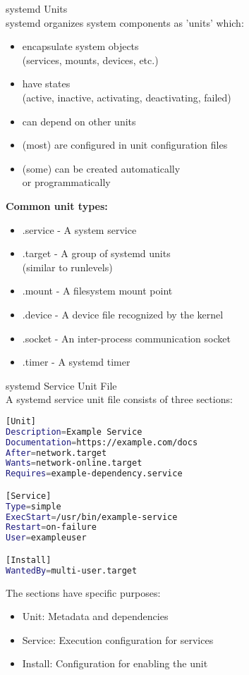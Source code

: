 \begin{definition}{systemd Units}\\
    systemd organizes system components as 'units' which:
    \begin{itemize}
        \item encapsulate system objects \\ (services, mounts, devices, etc.)
        \item have states \\ (active, inactive, activating, deactivating, failed)
        \item can depend on other units
        \item (most) are configured in unit configuration files
        \item (some) can be created automatically \\ or programmatically
    \end{itemize}
    \vspace{2mm}
    \textbf{Common unit types:}
    \begin{itemize}
        \item .service - A system service
        \item .target - A group of systemd units \\ (similar to runlevels)
        \item .mount - A filesystem mount point
        \item .device - A device file recognized by the kernel
        \item .socket - An inter-process communication socket
        \item .timer - A systemd timer
    \end{itemize}
\end{definition}

\begin{code}{systemd Service Unit File}\\
    A systemd service unit file consists of three sections:
    
\begin{lstlisting}[language=bash, style=basesmol]
[Unit]
Description=Example Service
Documentation=https://example.com/docs
After=network.target
Wants=network-online.target
Requires=example-dependency.service

[Service]
Type=simple
ExecStart=/usr/bin/example-service
Restart=on-failure
User=exampleuser

[Install]
WantedBy=multi-user.target
\end{lstlisting}

    The sections have specific purposes:
    \begin{itemize}
        \item Unit: Metadata and dependencies
        \item Service: Execution configuration for services
        \item Install: Configuration for enabling the unit
    \end{itemize}
\end{code}

